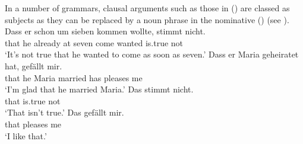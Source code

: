\noindent
In a number of grammars, clausal arguments such as those in () are classed as subjects as they can be replaced
by a noun phrase in the nominative () (see \eg \citealp[, 289]{Eisenberg2004a}).
\eal
\ex
\gll Dass er schon um sieben kommen wollte, stimmt nicht.\\
	 that he already at seven come wanted is.true not\\
\glt `It's not true that he wanted to come as soon as seven.'
\ex 
\gll Dass er Maria geheiratet hat, gefällt mir.\\
	 that he Maria married has pleases me\\
\glt `I'm glad that he married Maria.'
\zl
\eal
\ex
\gll Das stimmt nicht.\\
	 that is.true not\\
\glt `That isn't true.'
\ex 
\gll Das gefällt mir.\\
	 that pleases me\\
\glt `I like that.'
\zl
